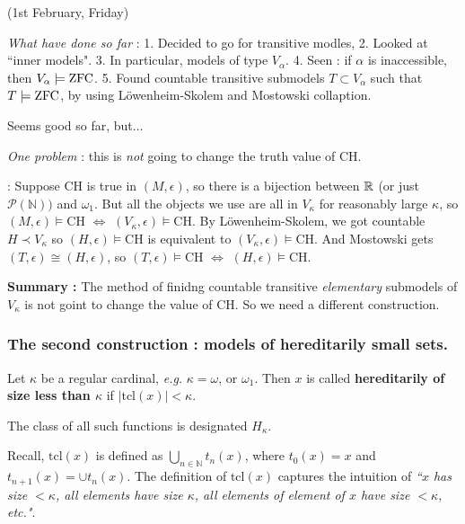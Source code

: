 \documentclass[12pt,a4paper]{article}
\newenvironment{subproof}
{\begin{changemargin}{0.5cm}{0.5cm} 
	}%
	{\end{changemargin}
}
\begin{document}
\s

\newday

(1st February, Friday)
\s

\emph{What have done so far} : 1. Decided to go for transitive modles, 2. Looked at ``inner models". 3. In particular, models of type $V_{\alpha}$. 4. Seen : if $\alpha$ is inaccessible, then $V_{\alpha} \models \text{ZFC}$. 5. Found countable transitive submodels $T \subset V_{\alpha}$ such that $T\models \text{ZFC}$, by using L\"owenheim-Skolem and Mostowski collaption.
\s

Seems good so far, but$\ldots$

\emph{One problem} : this is \emph{not} going to change the truth value of CH.
\begin{subproof}
: Suppose CH is true in $(M, \epsilon)$, so there is a bijection between $\mathbb{R}$ (or just $\mathscr{P}(\mathbb{N}))$ and $\omega_1$. But all the objects we use are all in $V_{\kappa}$ for reasonably large $\kappa$, so $(M, \epsilon) \models$CH $\Leftrightarrow$ $(V_{\kappa}, \epsilon) \models$CH. By L\"owenheim-Skolem, we got countable $H \prec V_{\kappa}$ so $(H, \epsilon) \models$CH is equivalent to $(V_{\kappa}, \epsilon)\models$CH. And Mostowski gets $(T, \epsilon) \cong (H, \epsilon)$, so $(T, \epsilon)\models$CH $\Leftrightarrow$ $(H, \epsilon) \models$CH.
\end{subproof}
\s

\textbf{Summary :} The method of finidng countable transitive \emph{elementary} submodels of $V_{\kappa}$ is not goint to change the value of CH. So we need a different construction.
\s

\subsubsection*{The second construction : models of hereditarily small sets.}

 Let $\kappa$ be a regular cardinal, \textit{e.g.} $\kappa =\omega$, or $\omega_1$. Then $x$ is called \textbf{hereditarily of size less than $\kappa$} if $|\text{tcl}(x)|< \kappa$.

\quad The class of all such functions is designated $H_{\kappa}$.
\s

Recall, $\text{tcl}(x)$ is defined as $\bigcup_{n\in \mathbb{N}} t_n(x)$, where $t_0(x)=x$ and $t_{n+1} (x) = \cup t_n(x)$. The definition of $\text{tcl}(x)$ captures the intuition of \emph{``$x$ has size $< \kappa$, all elements have size $\kappa$, all elements of element of $x$ have size $<\kappa$, etc."}.
\s
\end{document}
